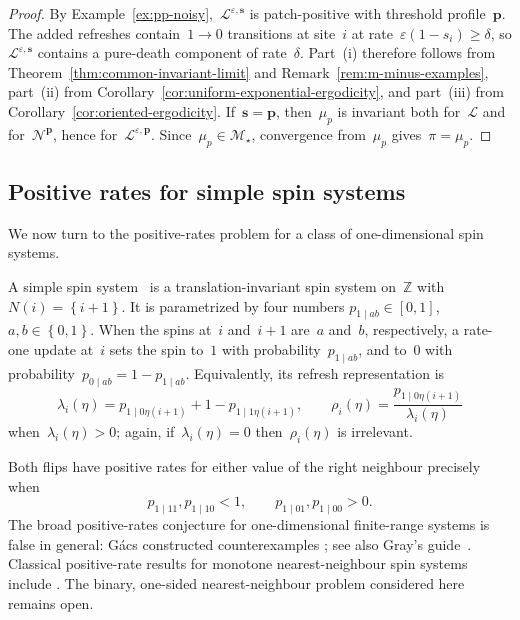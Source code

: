 \documentclass[EJP,preprint,NODS,nobera]{ejpecp}
\newcommand{\Z}{\mathbb{Z}}
\newcommand{\cb}[1]{\left\{#1\right\}}
\newcommand{\mb}[1]{\mathbf{#1}}
\newcommand{\Lcal}{\mathcal{L}}
\newcommand{\Ncal}{\mathcal{N}}
\begin{document}
\begin{proof}
By Example~\ref{ex:pp-noisy},~$\Lcal^{\varepsilon,\mb s}$ is patch-positive
with threshold profile~$\mb p$. The added refreshes contain~$1\to0$
transitions at site~$i$ at rate~$\varepsilon(1-s_i)\geq\delta$, so
$\Lcal^{\varepsilon,\mb s}$ contains a pure-death component of rate~$\delta$.
Part~\textup{(i)} therefore follows from
Theorem~\ref{thm:common-invariant-limit} and
Remark~\ref{rem:m-minus-examples}, part~\textup{(ii)} from
Corollary~\ref{cor:uniform-exponential-ergodicity}, and part~\textup{(iii)}
from Corollary~\ref{cor:oriented-ergodicity}. If~$\mb s=\mb p$, then~$\mu_p$ is
invariant both for~$\Lcal$ and for~$\Ncal^{\mb p}$, hence
for~$\Lcal^{\varepsilon,\mb p}$. Since~$\mu_p\in\mathcal M_\star$, convergence
from~$\mu_p$ gives~$\pi=\mu_p$.
\end{proof}

\subsection{Positive rates for simple spin systems}
\label{subsec:simple-positive-rates}

We now turn to the positive-rates problem for a class of one-dimensional spin
systems.

\begin{definition}
\label{def:simple-spin-systems}
A simple spin system~\cite{GluchowskiMenz2025, GluchowskiMenz2026} is a translation-invariant spin system on~$\Z$ with
$N(i)=\cb{i+1}$. It is parametrized by four numbers
$p_{1\mid ab}\in[0,1]$, $a,b\in\cb{0,1}$. When the spins at~$i$ and~$i+1$
are~$a$ and~$b$, respectively, a rate-one update at~$i$ sets the spin to~$1$
with probability~$p_{1\mid ab}$, and to~$0$ with probability~$p_{0\mid ab} = 1 -p_{1\mid ab}$. Equivalently, its refresh representation is
\begin{equation*}
\lambda_i(\eta)
=
p_{1\mid0\eta(i+1)}+1-p_{1\mid1\eta(i+1)},
\qquad
\rho_i(\eta)
=
\frac{p_{1\mid0\eta(i+1)}}{\lambda_i(\eta)}
\end{equation*}
when~$\lambda_i(\eta)>0$; again, if~$\lambda_i(\eta)=0$ then~$\rho_i(\eta)$ is irrelevant.
\end{definition}

Both flips have
positive rates for either value of the right neighbour precisely when
\begin{equation}
\label{eq:simple-positive-rates}
p_{1\mid11},p_{1\mid10}<1,
\qquad
p_{1\mid01},p_{1\mid00}>0.
\end{equation}
The broad positive-rates conjecture for one-dimensional finite-range systems
is false in general: G\'acs constructed counterexamples
\cite{Gacs1986,Gacs2001}; see also Gray's guide~\cite{Gray2001}. Classical
positive-rate results for monotone nearest-neighbour spin systems include
\cite{Gray1982}. The binary, one-sided nearest-neighbour problem considered
here remains open.
\end{document}
